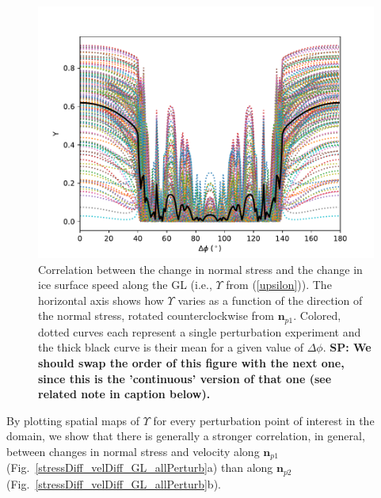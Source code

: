 \documentclass[review,oneside]{igs}
\begin{document}
\begin{figure}
	\centering
    \includegraphics[width=1\linewidth]{figs/stress_vel_corr_GL_allP.pdf}
    \caption{Correlation between the change in normal stress and the change in ice surface speed along the GL (i.e., $\Upsilon$ from (\ref{upsilon})). The horizontal axis shows how $\Upsilon$ varies as a function of the direction of the normal stress, rotated counterclockwise from $\mathbf{n}_{p1}$. Colored, dotted curves each represent a single perturbation experiment and the thick black curve is their mean for a given value of $\Delta\phi$. \textbf{SP: We should swap the order of this figure with the next one, since this is the 'continuous' version of that one (see related note in caption below).}}
	\label{stress_vel_corr_GL_allP}
\end{figure}
By plotting spatial maps of $\Upsilon$ for every perturbation point of interest in the domain, we show that there is generally a stronger correlation, in general, between changes in normal stress and velocity along $\mathbf{n}_{p1}$ (Fig.~\ref{stressDiff_velDiff_GL_allPerturb}a) than along $\mathbf{n}_{p2}$ (Fig.~\ref{stressDiff_velDiff_GL_allPerturb}b).  
\end{document}
